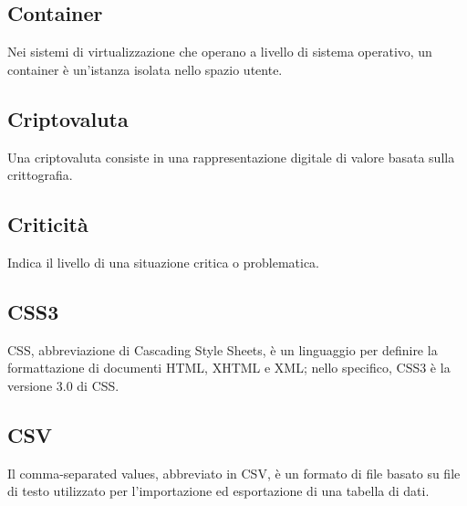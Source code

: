 \subsection*{Container}
Nei sistemi di virtualizzazione che operano a livello di sistema operativo, un container è un'istanza isolata nello spazio utente.

\subsection*{Criptovaluta}
Una criptovaluta consiste in una rappresentazione digitale di valore basata sulla crittografia.

\subsection*{Criticità}
Indica il livello di una situazione critica o problematica.

\subsection*{CSS3}
CSS, abbreviazione di Cascading Style Sheets, è un linguaggio per definire la formattazione di documenti HTML, XHTML e XML; nello specifico, CSS3 è la versione 3.0 di CSS.

\subsection*{CSV}
Il comma-separated values, abbreviato in CSV, è un formato di file basato su file di testo utilizzato per l'importazione ed esportazione di una tabella di dati.

